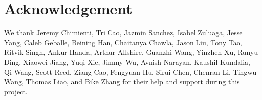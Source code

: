 \section*{Acknowledgement}
We thank Jeremy Chimienti, Tri Cao, Jazmin Sanchez, Isabel Zuluaga, Jesse Yang, Caleb Geballe, Beining Han, Chaitanya Chawla, Jason Liu, Tony Tao, Ritvik Singh, Ankur Handa, Arthur Allshire, Guanzhi Wang, Yinzhen Xu, Runyu Ding, Xiaowei Jiang, Yuqi Xie, Jimmy Wu, Avnish Narayan, Kaushil Kundalia, Qi Wang, Scott Reed, Ziang Cao, Fengyuan Hu, Sirui Chen, Chenran Li, Tingwu Wang, Thomas Liao, and Bike Zhang for their help and support during this project.